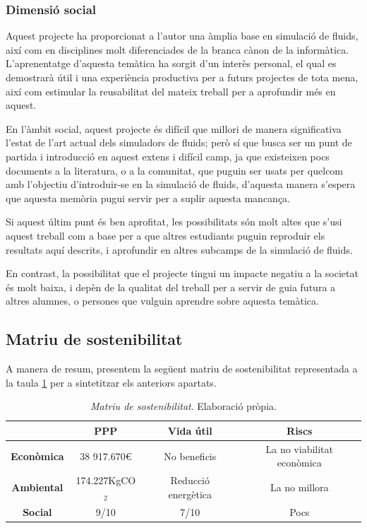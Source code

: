 \documentclass[a4paper]{article} %
\begin{document}
	\subsubsection{Dimensió social}
	Aquest projecte ha proporcionat a l'autor una àmplia base en simulació de fluids, així com en disciplines molt diferenciades de la branca cànon de la informàtica. L'aprenentatge d'aquesta temàtica ha sorgit d'un interès personal, el qual es demostrarà útil i una experiència productiva per a futurs projectes de tota mena, així com estimular la reusabilitat del mateix treball per a aprofundir més en aquest. \par
	En l'àmbit social, aquest projecte és difícil que millori de manera significativa l'estat de l'art actual dels simuladors de fluids; però sí que busca ser un punt de partida i introducció en aquest extens i difícil camp, ja que existeixen pocs documents a la literatura, o a la comunitat, que puguin ser usats per quelcom amb l'objectiu d'introduir-se en la simulació de fluids, d'aquesta manera s'espera que aquesta memòria pugui servir per a suplir aquesta mancança. \par
	Si aquest últim punt és ben aprofitat, les possibilitats són molt altes que s'usi aquest treball com a base per a que altres estudiants puguin reproduir els resultats aquí descrits, i aprofundir en altres subcamps de la simulació de fluids. \par
	En contrast, la possibilitat que el projecte tingui un impacte negatiu a la societat és molt baixa, i depèn de la qualitat del treball per a servir de guia futura a altres alumnes, o persones que vulguin aprendre sobre aquesta temàtica.
	
	\subsection{Matriu de sostenibilitat}
	A manera de resum, presentem la següent matriu de sostenibilitat representada a la taula \ref{table:sustanMatrix} per a sintetitzar els anteriors apartats.
	
	\begin{table}[h!]
		\centering
		\hspace*{-1cm}
		\begin{tabular}{|| c || c | c | c ||}
			\hline
			& \textbf{PPP} & \textbf{Vida útil} & \textbf{Riscs} \\
			\hline \hline
			\textbf{Econòmica} & 38 917.670\euro & No beneficis & La no viabilitat econòmica \\
			\hline
			\textbf{Ambiental} & 174.227KgCO$_2$ & Reducció energètica &La no millora \\
			\hline
			\textbf{Social} & 9/10 & 7/10 & Pocs \\ 
			\hline
		\end{tabular}
		
		\caption[\textit{Matriu de sostenibilitat}]{\textit{\small Matriu de sostenibilitat}. Elaboració pròpia.}
		\label{table:sustanMatrix}
	\end{table}
	
	\newpage
	
	\renewcommand{\bibname}{Referències}
	
	 
	
	
	
	
\end{document}
